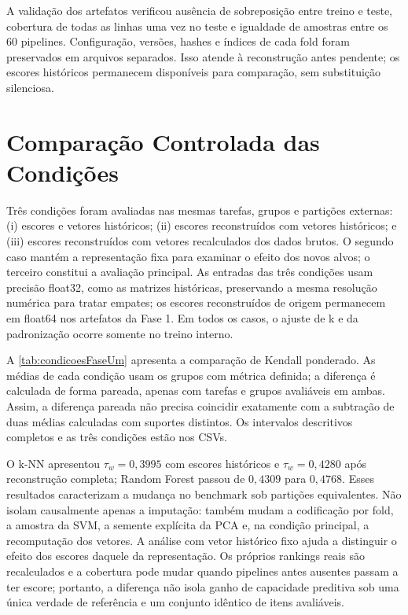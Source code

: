 A validação dos artefatos verificou ausência de sobreposição entre treino e teste, cobertura de todas as linhas uma vez no teste e igualdade de amostras entre os 60 pipelines. Configuração, versões, hashes e índices de cada fold foram preservados em arquivos separados. Isso atende à reconstrução antes pendente; os escores históricos permanecem disponíveis para comparação, sem substituição silenciosa.

\section{Comparação Controlada das Condições}

Três condições foram avaliadas nas mesmas tarefas, grupos e partições externas: (i) escores e vetores históricos; (ii) escores reconstruídos com vetores históricos; e (iii) escores reconstruídos com vetores recalculados dos dados brutos. O segundo caso mantém a representação fixa para examinar o efeito dos novos alvos; o terceiro constitui a avaliação principal. As entradas das três condições usam precisão float32, como as matrizes históricas, preservando a mesma resolução numérica para tratar empates; os escores reconstruídos de origem permanecem em float64 nos artefatos da Fase 1. Em todos os casos, o ajuste de k e da padronização ocorre somente no treino interno.

A \autoref{tab:condicoesFaseUm} apresenta a comparação de Kendall ponderado. As médias de cada condição usam os grupos com métrica definida; a diferença é calculada de forma pareada, apenas com tarefas e grupos avaliáveis em ambas. Assim, a diferença pareada não precisa coincidir exatamente com a subtração de duas médias calculadas com suportes distintos. Os intervalos descritivos completos e as três condições estão nos CSVs.

\begin{table}[htbp]
\centering
\caption{Comparação da referência revisada com a reconstrução integral}
\label{tab:condicoesFaseUm}
\resizebox{\textwidth}{!}{}
\end{table}

O k-NN apresentou $\tau_w=0{,}3995$ com escores históricos e $\tau_w=0{,}4280$ após reconstrução completa; Random Forest passou de $0{,}4309$ para $0{,}4768$. Esses resultados caracterizam a mudança no benchmark sob partições equivalentes. Não isolam causalmente apenas a imputação: também mudam a codificação por fold, a amostra da SVM, a semente explícita da PCA e, na condição principal, a recomputação dos vetores. A análise com vetor histórico fixo ajuda a distinguir o efeito dos escores daquele da representação. Os próprios rankings reais são recalculados e a cobertura pode mudar quando pipelines antes ausentes passam a ter escore; portanto, a diferença não isola ganho de capacidade preditiva sob uma única verdade de referência e um conjunto idêntico de itens avaliáveis.

